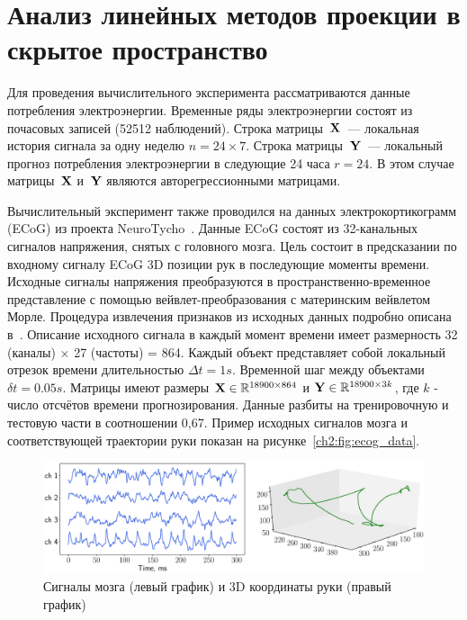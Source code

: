 \hrulefill

\section{Анализ линейных методов проекции в скрытое пространство}
Для проведения вычислительного эксперимента рассматриваются данные потребления электроэнергии.
Временные ряды электроэнергии состоят из почасовых записей (52512 наблюдений). 
Строка матрицы~$\mathbf{X}$~--– локальная история сигнала за одну неделю $n = 24 \times 7$. 
Строка матрицы~$\mathbf{Y}$~--- локальный прогноз потребления электроэнергии в следующие 24 часа $r = 24$. 
В этом случае матрицы~$\mathbf{X}$ и~$\mathbf{Y}$ являются авторегрессионными матрицами.

Вычислительный эксперимент также проводился на данных электрокортикограмм (ECoG) из проекта NeuroTycho~\cite{shimoda2012decoding}.
Данные ECoG состоят из 32-канальных сигналов напряжения, снятых с головного мозга.
Цель состоит в предсказании по входному сигналу ECoG 3D позиции рук в последующие моменты времени.
Исходные сигналы напряжения преобразуются в пространственно-временное представление с помощью вейвлет-преобразования с материнским вейвлетом Морле.
Процедура извлечения признаков из исходных данных подробно описана в~\cite{chao2010long,eliseyev2016penalized}.
Описание исходного сигнала в каждый момент времени имеет размерность 32 (каналы) $\times $ 27 (частоты) = 864.
Каждый объект представляет собой локальный отрезок времени длительностью $\Delta t = 1s$. 
Временной шаг между объектами $\delta t = 0.05 s$.
Матрицы имеют размеры $\mathbf{X} \in \mathbb{R}^{18900 \times 864}$ и $\mathbf{Y} \in \mathbb{R}^{18900 \times 3k}$, где $k$ - число отсчётов времени прогнозирования.
Данные разбиты на тренировочную и тестовую части в соотношении 0,67. 
Пример исходных сигналов мозга и соответствующей траектории руки показан на рисунке~\ref{ch2:fig:ecog_data}.

\begin{figure}
	\centering
	\includegraphics[width=\linewidth]{figs/ch2/ecog_data}
	\caption{Сигналы мозга (левый график) и 3D координаты руки (правый график)}
	\label{ch1:fig:ecog_data}
\end{figure}

